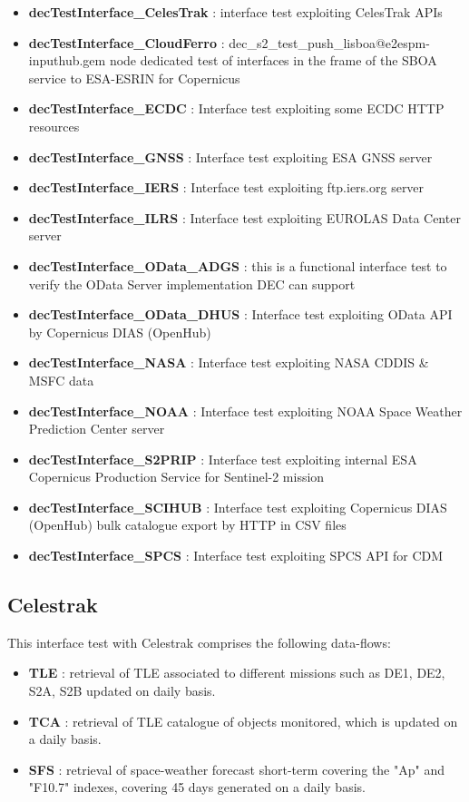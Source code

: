 \documentclass[dec_sum_main.tex]{subfiles}
\begin{document}
\begin{itemize}
    \item \textbf{decTestInterface\_CelesTrak} : interface test exploiting CelesTrak APIs
     \item \textbf{decTestInterface\_CloudFerro} : dec\_s2\_test\_push\_lisboa@e2espm-inputhub.gem node dedicated test of interfaces in the frame of the SBOA service to ESA-ESRIN for Copernicus
     \item \textbf{decTestInterface\_ECDC} : Interface test exploiting some ECDC HTTP resources
     \item \textbf{decTestInterface\_GNSS} : Interface test exploiting ESA GNSS server
     \item \textbf{decTestInterface\_IERS} : Interface test exploiting ftp.iers.org  server
     \item \textbf{decTestInterface\_ILRS} : Interface test exploiting EUROLAS Data Center server
     \item \textbf{decTestInterface\_OData\_ADGS} : this is a functional interface test to verify the OData Server implementation DEC can support
     \item \textbf{decTestInterface\_OData\_DHUS} : Interface test exploiting OData API by Copernicus DIAS (OpenHub)
     \item \textbf{decTestInterface\_NASA} : Interface test exploiting NASA CDDIS \& MSFC data
     \item \textbf{decTestInterface\_NOAA} : Interface test exploiting NOAA Space Weather Prediction Center server
     \item \textbf{decTestInterface\_S2PRIP} : Interface test exploiting internal ESA Copernicus Production Service for Sentinel-2 mission
     \item \textbf{decTestInterface\_SCIHUB} : Interface test exploiting Copernicus DIAS (OpenHub) bulk catalogue export by HTTP in CSV files
     \item \textbf{decTestInterface\_SPCS} : Interface test exploiting SPCS API for CDM     
\end{itemize}

\subsection{Celestrak}
This interface test with Celestrak comprises the following data-flows:
\begin{itemize}
    \item \textbf{TLE} : retrieval of TLE associated to different missions such as DE1, DE2, S2A, S2B updated on daily basis.
    \item \textbf{TCA} : retrieval of TLE catalogue of objects monitored, which is updated on a daily basis.
    \item \textbf{SFS} : retrieval of space-weather forecast short-term covering the "Ap" and "F10.7" indexes, covering 45 days generated on a daily basis.
\end{itemize}
\end{document}
